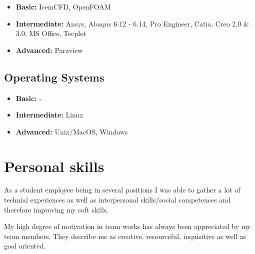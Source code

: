 \documentclass[11pt,a4paper,sans]{moderncv}        %
\begin{document}
\vspace{3pt}

\begin{itemize}

\setlength\itemsep{1em}

\item \textbf{Basic:} IcemCFD, OpenFOAM

\item \textbf{Intermediate:} Ansys, Abaqus 6.12 - 6.14, Pro Engineer, Catia, Creo 2.0 \& 3.0, MS Office, Tecplot

\item \textbf{Advanced:} Paraview

\end{itemize}

\vspace{6pt}

\subsection{Operating Systems}

\vspace{3pt}

\begin{itemize}

\setlength\itemsep{1em}

\item \textbf{Basic:} -

\item \textbf{Intermediate:} Linux

\item \textbf{Advanced:} Unix/MacOS, Windows

\end{itemize}


\section{Personal skills}

\vspace{6pt}

\small{As a student employee being in several positions I was able to gather a lot of technial experiences as well as interpersonal skills/social competences and therefore improving my soft skills. \newline

My high degree of motivation in team works has always been appreciated by my team members. They describe me as creative, resourceful, inquisitive as well as goal oriented.}
\end{document}
